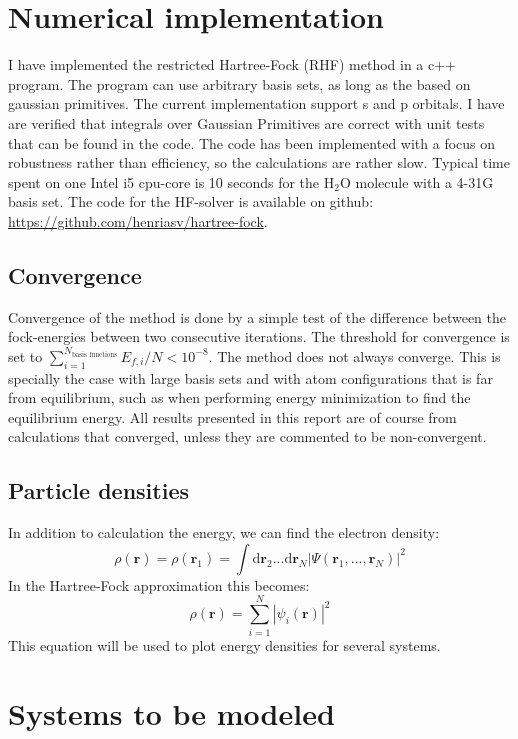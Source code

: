 \documentclass[a4paper,10pt, twocolumn, pre]{revtex4}
\newcommand{\rvec}{\mathbf{r}}
\newcommand{\dd}{\mathrm{d}}
\begin{document}
\section{Numerical implementation}
I have implemented the restricted Hartree-Fock (RHF) method in a c++ program. The program can use arbitrary basis sets, as long as the based on gaussian primitives. The current implementation support s and p orbitals. I have are verified that integrals over Gaussian Primitives are correct with unit tests that can be found in the code. The code has been implemented with a focus on robustness rather than efficiency, so the calculations are rather slow. Typical time spent on one Intel i5 cpu-core is 10 seconds for the H$_2$O molecule with a 4-31G basis set. The code for the HF-solver is available on github: \url{https://github.com/henriasv/hartree-fock}.

\subsection{Convergence}
Convergence of the method is done by a simple test of the difference between the fock-energies between two consecutive iterations. The threshold for convergence is set to $\sum_{i=1}^{N_{\text{basis functions}}} E_{f, i}/N < 10^{-8}$. The method does not always converge. This is specially the case with large basis sets and with atom configurations that is far from equilibrium, such as when performing energy minimization to find the equilibrium energy. All results presented in this report are of course from calculations that converged, unless they are commented to be non-convergent.

\subsection{Particle densities}
In addition to calculation the energy, we can find the electron density:
\begin{equation}
	\rho(\rvec) = \rho(\rvec_1) = \int \dd \rvec_2 ... \dd \rvec_N |\Psi(\rvec_1, ..., \rvec_N)|^2
\end{equation}
In the Hartree-Fock approximation this becomes:
\begin{equation}
	\rho(\rvec) = \sum_{i=1}^{N}|\psi_i(\rvec)|^2
\end{equation}
This equation will be used to plot energy densities for several systems. 

\section{Systems to be modeled}
\end{document}
